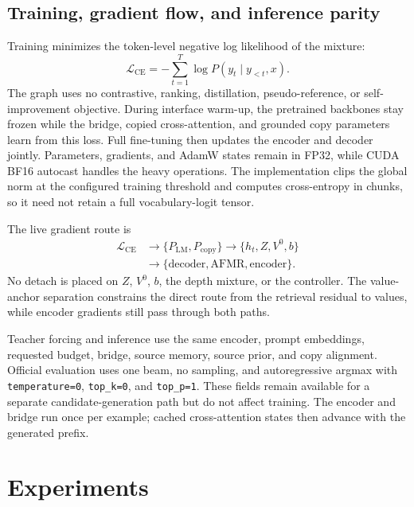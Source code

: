 \subsection{Training, gradient flow, and inference parity}
\label{sec:training-method}

Training minimizes the token-level negative log likelihood of the mixture:
\begin{equation}
  \mathcal L_{\mathrm{CE}}=-\sum_{t=1}^{T}
  \log P(y_t\mid y_{<t},x).
  \label{eq:objective}
\end{equation}
The graph uses no contrastive, ranking, distillation, pseudo-reference, or
self-improvement objective.  During interface warm-up, the pretrained
backbones stay frozen while the bridge, copied cross-attention, and grounded
copy parameters learn from this loss.  Full fine-tuning then updates the
encoder and decoder jointly.  Parameters, gradients, and AdamW states remain
in FP32, while CUDA BF16 autocast handles the heavy operations.  The
implementation clips the global norm at the configured training threshold and
computes cross-entropy in chunks, so it need not retain a full vocabulary-logit
tensor.

The live gradient route is
\[
\begin{aligned}
\mathcal L_{\mathrm{CE}}&\rightarrow\{P_{\mathrm{LM}},P_{\mathrm{copy}}\}
\rightarrow\{h_t,Z,V^0,b\}\\
&\rightarrow\{\text{decoder},\text{AFMR},\text{encoder}\}.
\end{aligned}
\]
No detach is placed on $Z$, $V^0$, $b$, the depth mixture, or the controller.
The value-anchor separation constrains the direct route from the retrieval
residual to values, while encoder gradients still pass through both paths.

Teacher forcing and inference use the same encoder, prompt embeddings,
requested budget, \AFMR bridge, source memory, source prior, and copy
alignment.  Official evaluation uses one beam, no sampling, and autoregressive
argmax with \texttt{temperature=0}, \texttt{top\_k=0}, and \texttt{top\_p=1}.
These fields remain available for a separate candidate-generation path but do
not affect training.  The encoder and bridge run once per example; cached
cross-attention states then advance with the generated prefix.

\section{Experiments}
\label{sec:experiments}

